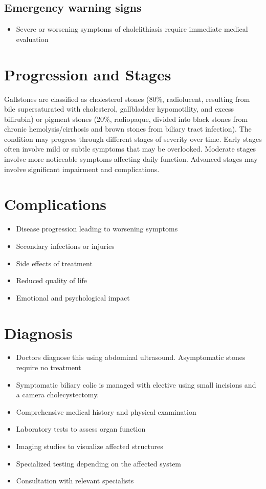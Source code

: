 \subsection{Emergency warning signs}
\begin{itemize}[noitemsep]
  \item Severe or worsening symptoms of cholelithiasis require immediate medical evaluation
\end{itemize}
\section{Progression and Stages}
Gallstones are classified as cholesterol stones (80\%, radiolucent, resulting from bile supersaturated with cholesterol, gallbladder hypomotility, and excess bilirubin) or pigment stones (20\%, radiopaque, divided into black stones from chronic hemolysis/cirrhosis and brown stones from biliary tract infection). The condition may progress through different stages of severity over time. Early stages often involve mild or subtle symptoms that may be overlooked. Moderate stages involve more noticeable symptoms affecting daily function. Advanced stages may involve significant impairment and complications.
\section{Complications}
\begin{itemize}[noitemsep]
  \item Disease progression leading to worsening symptoms
  \item Secondary infections or injuries
  \item Side effects of treatment
  \item Reduced quality of life
  \item Emotional and psychological impact
\end{itemize}
\section{Diagnosis}
\begin{itemize}[noitemsep]
  \item Doctors diagnose this using abdominal ultrasound. Asymptomatic stones require no treatment
  \item Symptomatic biliary colic is managed with elective using small incisions and a camera cholecystectomy.
  \item Comprehensive medical history and physical examination
  \item Laboratory tests to assess organ function
  \item Imaging studies to visualize affected structures
  \item Specialized testing depending on the affected system
  \item Consultation with relevant specialists
\end{itemize}
